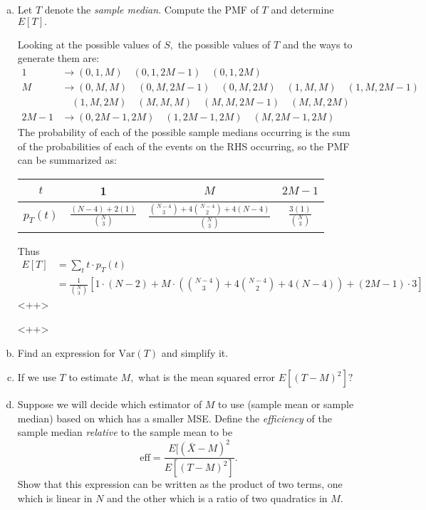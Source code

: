 \documentclass{article}
\newcommand{\var}{\mathrm{Var}}
\begin{document}
\begin{enumerate}
\begin{enumerate}[(a)]
			\item Let $T$ denote the \textit{sample median}. Compute the PMF of $T$ and determine $E[T].$
				\begin{soln}
					Looking at the possible values of $S,$ the possible values of $T$ and the ways to generate them are:
					\begin{align*}
						1 &\to (0, 1, M)\quad(0, 1, 2M-1)\quad(0, 1, 2M) \\
						M&\to (0, M, M)\quad(0, M, 2M-1)\quad(0, M, 2M)\quad(1, M, M)\quad(1, M, 2M-1) \\ &\quad(1, M, 2M)\quad(M, M, M)\quad(M, M, 2M-1)\quad(M, M, 2M) \\
						2M-1&\to (0, 2M-1, 2M)\quad (1, 2M-1, 2M)\quad(M, 2M-1, 2M)
					\end{align*}
					The probability of each of the possible sample medians occurring is the sum of the probabilities of each of the events on the RHS occurring, so the PMF can be summarized as:
					\begin{center}
						\begin{tabular}{c||c|c|c}
							$t$ & 1 & $M$ & $2M-1$ \\
							\hline
							$p_T(t)$ & $\displaystyle\frac{(N-4) + 2(1)}{\binom{N}{3}}$ & $\displaystyle\frac{\binom{N-4}{3}+4\binom{N-4}{2}+4(N-4)}{\binom{N}{3}}$ & $\displaystyle\frac{3(1)}{\binom{N}{3}}$
						\end{tabular}
					\end{center}

					Thus
					\begin{align*}
						E[T] &= \sum_{t}^{}t\cdot p_T(t) \\
						&= \frac{1}{\binom{N}{3}} \left[ 1\cdot(N-2)+M\cdot\left( \binom{N-4}{3}+4\binom{N-4}{2}+4(N-4) \right)+ (2M-1)\cdot 3 \right]
					\end{align*}<++>
				\end{soln}<++>

			\item Find an expression for $\var(T)$ and simplify it.

			\item If we use $T$ to estimate $M,$ what is the mean squared error $E[(T-M)^2]?$

			\item Suppose we will decide which estimator of $M$ to use (sample mean or sample median) based on which has a smaller MSE. Define the \textit{efficiency} of the sample median \textit{relative} to the sample mean to be \[\text{eff}=\frac{E[(\bar{X}-M)^2}{E[(T-M)^2]}.\] Show that this expression can be written as the product of two terms, one which is linear in $N$ and the other which is a ratio of two quadratics in $M.$


\end{enumerate}
\end{enumerate}
\end{document}
